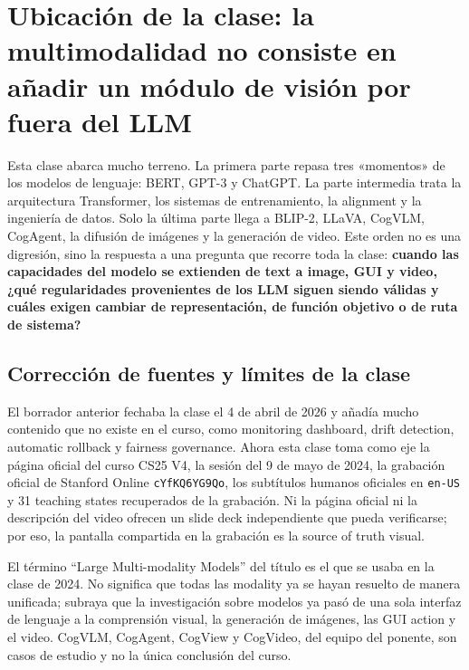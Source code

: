 \section{Ubicación de la clase: la multimodalidad no consiste en añadir un módulo de visión por fuera del LLM}

Esta clase abarca mucho terreno. La primera parte repasa tres «momentos» de los modelos de lenguaje: BERT, GPT-3 y ChatGPT. La parte intermedia trata la arquitectura Transformer, los sistemas de entrenamiento, la alignment y la ingeniería de datos. Solo la última parte llega a BLIP-2, LLaVA, CogVLM, CogAgent, la difusión de imágenes y la generación de video. Este orden no es una digresión, sino la respuesta a una pregunta que recorre toda la clase: \textbf{cuando las capacidades del modelo se extienden de text a image, GUI y video, ¿qué regularidades provenientes de los LLM siguen siendo válidas y cuáles exigen cambiar de representación, de función objetivo o de ruta de sistema?}

\subsection{Corrección de fuentes y límites de la clase}

El borrador anterior fechaba la clase el 4 de abril de 2026 y añadía mucho contenido que no existe en el curso, como monitoring dashboard, drift detection, automatic rollback y fairness governance. Ahora esta clase toma como eje la página oficial del curso CS25 V4, la sesión del 9 de mayo de 2024, la grabación oficial de Stanford Online \texttt{cYfKQ6YG9Qo}, los subtítulos humanos oficiales en \texttt{en-US} y 31 teaching states recuperados de la grabación. Ni la página oficial ni la descripción del video ofrecen un slide deck independiente que pueda verificarse; por eso, la pantalla compartida en la grabación es la source of truth visual.


El término ``Large Multi-modality Models'' del título es el que se usaba en la clase de 2024. No significa que todas las modality ya se hayan resuelto de manera unificada; subraya que la investigación sobre modelos ya pasó de una sola interfaz de lenguaje a la comprensión visual, la generación de imágenes, las GUI action y el video. CogVLM, CogAgent, CogView y CogVideo, del equipo del ponente, son casos de estudio y no la única conclusión del curso.

